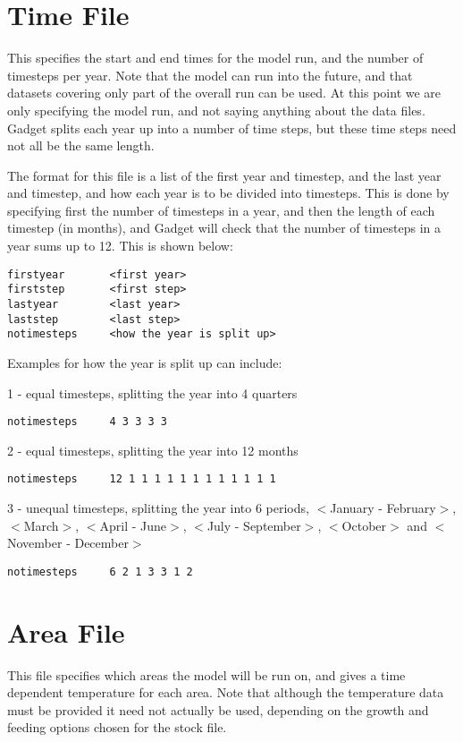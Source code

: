 \documentclass [a4paper, 10pt]{book}
\begin{document}
\section{Time File}\label{sec:timefile}
This specifies the start and end times for the model run, and the number of timesteps per year. Note that the model can run into the future, and that datasets covering only part of the overall run can be used.  At this point we are only specifying the model run, and not saying anything about the data files.  Gadget splits each year up into a number of time steps, but these time steps need not all be the same length.

\bigskip
The format for this file is a list of the first year and timestep, and the last year and timestep, and how each year is to be divided into timesteps.  This is done by specifying first the number of timesteps in a year, and then the length of each timestep (in months), and Gadget will check that the number of timesteps in a year sums up to 12.  This is shown below:

{\small\begin{verbatim}
firstyear       <first year>
firststep       <first step>
lastyear        <last year>
laststep        <last step>
notimesteps     <how the year is split up>
\end{verbatim}}

Examples for how the year is split up can include:\newline

1 - equal timesteps, splitting the year into 4 quarters
{\small\begin{verbatim}
notimesteps     4 3 3 3 3
\end{verbatim}}

2 - equal timesteps, splitting the year into 12 months
{\small\begin{verbatim}
notimesteps     12 1 1 1 1 1 1 1 1 1 1 1 1
\end{verbatim}}

3 - unequal timesteps, splitting the year into 6 periods, $<$January - February$>$, $<$March$>$, $<$April - June$>$, $<$July - September$>$, $<$October$>$ and $<$November - December$>$
{\small\begin{verbatim}
notimesteps     6 2 1 3 3 1 2
\end{verbatim}}

\section{Area File}\label{sec:areafile}
This file specifies which areas the model will be run on, and gives a time dependent temperature for each area.  Note that although the temperature data must be provided it need not actually be used, depending on the growth and feeding options chosen for the stock file.
\end{document}
